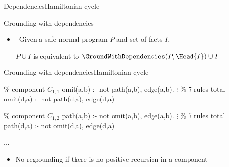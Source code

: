 \begin{frame}[shrink]{Dependencies}{Hamiltonian cycle}
  \begin{center}
    \DepGraph
  \end{center}
\end{frame}
\begin{frame}{Grounding with dependencies}
  \bigskip
  \begin{center}
  \end{center}
  \bigskip
  \begin{itemize}
  \item<2->  \ Given a safe normal program \(P\) and set of facts \(I\),

    \(P \cup I\) is equivalent to \(\GroundWithDependencies(P,\Head{I}) \cup I\)
  \end{itemize}
\end{frame}
\begin{frame}{Grounding with dependencies}{Hamiltonian cycle}
\newcommand{\Component}[1]{\(C_{#1}\)}
\begin{SemiVerbatim}{.9}
{\color{comment}\% component \Component{1,1}}
omit(a,b) :- not path(a,b), \alert{edge(a,b)}.
          \(\vdots\) {\color{comment}\% 7 rules total}
omit(d,a) :- not path(d,a), \alert{edge(d,a)}.

{\color{comment}\% component \Component{1,2}}
path(a,b) :- not omit(a,b), \alert{edge(a,b)}.
          \(\vdots\) {\color{comment}\% 7 rules total}
path(d,a) :- not omit(d,a), \alert{edge(d,a)}.

...
\end{SemiVerbatim}
\vspace{-.8cm}
\begin{itemize}
\item<2-> No regrounding if there is no positive recursion in a component
\end{itemize}
\smallskip
\end{frame}
